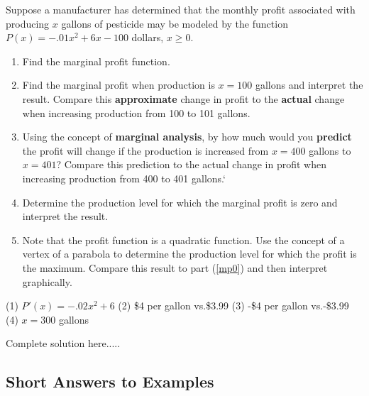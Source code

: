 \begin{example}
Suppose a manufacturer has determined that the monthly profit associated with producing $x$ gallons of pesticide may be modeled by the function $P(x)=-.01x^2+6x-100$ dollars, $x\ge 0$.
\renewcommand{\labelenumi}{(\arabic{enumi})}
\begin{enumerate}[leftmargin=*]
\item Find the marginal profit function.\vspace{1in}
\item Find the marginal profit when production is $x=100$ gallons and interpret the result.  Compare this \textbf{approximate} change in profit to the \textbf{actual} change when increasing production from 100 to 101 gallons. \vspace{2in}
\item Using the concept of \textbf{marginal analysis}, by how much would you \textbf{predict} the profit will change if the  production is increased from $x=400$ gallons to $x=401$?  Compare this prediction to the actual change in profit when increasing production from 400 to 401 gallons.`%
\vspace{2in}
\item Determine the production level for which the marginal profit is zero and interpret the result.  \label{mp0}  \vspace{3in}
\item Note that the profit function is a quadratic function.  Use the concept of a vertex of a parabola to determine the production level for which the profit is the maximum.  Compare this result to part (\ref{mp0}) and then interpret graphically. 
\end{enumerate}
    \begin{sol}
    (1) $P'(x)=-.02x^2+6$ (2) \$4 per gallon vs.\$3.99 (3) -\$4 per gallon vs.-\$3.99 (4) $x=300$ gallons
    \end{sol}
    \begin{solL}
    Complete solution here.....
    
    \end{solL}
    
\end{example}
\vspace*{\fill}





\subsection*{Short Answers to Examples}
\begin{multicols}{2}

\end{multicols}


